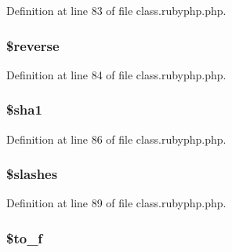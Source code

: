 Definition at line 83 of file class.\-rubyphp.\-php.

\hypertarget{class_pierce_moore_1_1_ruby_p_h_p_1_1r_ae0d210fd358fa750a11e63b26f6d26ea}{
\subsubsection[{\$reverse}]{\setlength{\rightskip}{0pt plus 5cm}\${\bf reverse}}}\label{class_pierce_moore_1_1_ruby_p_h_p_1_1r_ae0d210fd358fa750a11e63b26f6d26ea}


Definition at line 84 of file class.\-rubyphp.\-php.

\hypertarget{class_pierce_moore_1_1_ruby_p_h_p_1_1r_a310d84f0b735d2ab692b4e2acd90e7ef}{
\subsubsection[{\$sha1}]{\setlength{\rightskip}{0pt plus 5cm}\${\bf sha1}}}\label{class_pierce_moore_1_1_ruby_p_h_p_1_1r_a310d84f0b735d2ab692b4e2acd90e7ef}


Definition at line 86 of file class.\-rubyphp.\-php.

\hypertarget{class_pierce_moore_1_1_ruby_p_h_p_1_1r_ac95fd27a35f2d9674ef3760a4ea1d07f}{
\subsubsection[{\$slashes}]{\setlength{\rightskip}{0pt plus 5cm}\${\bf slashes}}}\label{class_pierce_moore_1_1_ruby_p_h_p_1_1r_ac95fd27a35f2d9674ef3760a4ea1d07f}


Definition at line 89 of file class.\-rubyphp.\-php.

\hypertarget{class_pierce_moore_1_1_ruby_p_h_p_1_1r_a85a2ada0b16d9e59f094e77df5848459}{
\subsubsection[{\$to\-\_\-f}]{\setlength{\rightskip}{0pt plus 5cm}\${\bf to\-\_\-f}}}\label{class_pierce_moore_1_1_ruby_p_h_p_1_1r_a85a2ada0b16d9e59f094e77df5848459}


